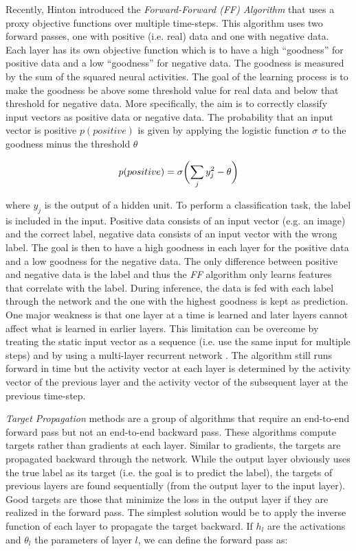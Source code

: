 Recently, Hinton  introduced the \emph{Forward-Forward (FF) Algorithm} that uses a proxy objective functions over multiple time-steps.
This algorithm uses two forward passes, one with positive (i.e. real) data and one with negative data.
Each layer has its own objective function which is to have a high ``goodness'' for positive data and a low ``goodness'' for negative data. 
The goodness is measured by the sum of the squared neural activities.
The goal of the learning process is to make the goodness be above some threshold value for real data and below that threshold for negative data.
More specifically, the aim is to correctly classify input vectors as positive data or negative data.
The probability that an input vector is positive $p(positive)$ is given by applying the logistic function $\sigma$ to the goodness minus the threshold $\theta$

\begin{equation}\eqlbl{ff2}
	p(positive) = \sigma \biggl( \sum_j y^2_j - \theta \biggr)
\end{equation}

where $y_j$ is the output of a hidden unit.
To perform a classification task, the label is included in the input.
Positive data consists of an input vector (e.g. an image) and the correct label, negative data consists of an input vector with the wrong label.
The goal is then to have a high goodness in each layer for the positive data and a low goodness for the negative data.
The only difference between positive and negative data is the label and thus the \emph{FF} algorithm only learns features that correlate with the label.
During inference, the data is fed with each label through the network and the one with the highest goodness is kept as prediction.
One major weakness is that one layer at a time is learned and later layers cannot affect what is learned in earlier layers.
This limitation can be overcome by treating the static input vector as a sequence (i.e. use the same input for multiple steps) and by using a multi-layer recurrent network .
The algorithm still runs forward in time but the activity vector at each layer is determined by the activity vector of the previous layer and the activity vector of the subsequent layer at the previous time-step.

\emph{Target Propagation} methods are a group of algorithms that require an end-to-end forward pass but not an end-to-end backward pass.
These algorithms compute targets rather than gradients at each layer.
Similar to gradients, the targets are propagated backward through the network.
While the output layer obviously uses the true label as its target (i.e. the goal is to predict the label), the targets of previous layers are found sequentially (from the output layer to the input layer).
Good targets are those that minimize the loss in the output layer if they are realized in the forward pass.
The simplest solution would be to apply the inverse function of each layer to propagate the target backward.
If $h_l$ are the activations and $\theta_l$ the parameters of layer $l$, we can define the forward pass as:

